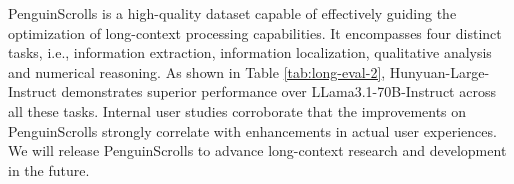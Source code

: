 \documentclass{article}
\begin{document}
\begin{table}[!th]
\caption{The performance of Hunyuan-Large-Instruct on PenguinScrolls.}
\label{tab:long-eval-2}
\end{table}

PenguinScrolls is a high-quality dataset capable of effectively guiding the optimization of long-context processing capabilities. It encompasses four distinct tasks, i.e., information extraction, information localization, qualitative analysis and numerical reasoning. As shown in Table \ref{tab:long-eval-2}, Hunyuan-Large-Instruct demonstrates superior performance over LLama3.1-70B-Instruct across all these tasks. 
Internal user studies corroborate that the improvements on PenguinScrolls strongly correlate with enhancements in actual user experiences. We will release PenguinScrolls to advance long-context research and development in the future.
\end{document}
